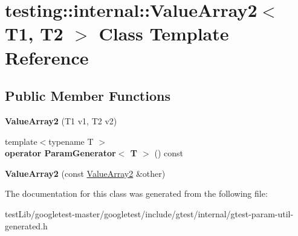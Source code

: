 \hypertarget{classtesting_1_1internal_1_1ValueArray2}{}\section{testing\+:\+:internal\+:\+:Value\+Array2$<$ T1, T2 $>$ Class Template Reference}
\label{classtesting_1_1internal_1_1ValueArray2}
\subsection*{Public Member Functions}
\begin{DoxyCompactItemize}
\item 
\mbox{\label{classtesting_1_1internal_1_1ValueArray2_af641714b9a06929e4dcabe8854d0da1c}} 
{\bfseries Value\+Array2} (T1 v1, T2 v2)
\item 
\mbox{\label{classtesting_1_1internal_1_1ValueArray2_aa81899f10bfd345c17aae540acc296a9}} 
{\footnotesize template$<$typename T $>$ }\\{\bfseries operator Param\+Generator$<$ T $>$} () const
\item 
\mbox{\label{classtesting_1_1internal_1_1ValueArray2_ac0da580bf4f38494da741c7140a7927d}} 
{\bfseries Value\+Array2} (const \hyperlink{classtesting_1_1internal_1_1ValueArray2}{Value\+Array2} \&other)
\end{DoxyCompactItemize}


The documentation for this class was generated from the following file\+:\begin{DoxyCompactItemize}
\item 
test\+Lib/googletest-\/master/googletest/include/gtest/internal/gtest-\/param-\/util-\/generated.\+h\end{DoxyCompactItemize}
